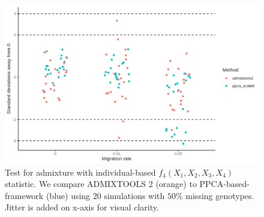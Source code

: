 \documentclass[12pt]{article}
\begin{document}
\begin{figure}[ht!]
    \includegraphics[width=16.5cm]{Images/Figures/hypothesis_test_comparison.png}
    \centering
         \caption{Test for admixture with individual-based $f_4(X_1, X_2, X_3, X_4)$ statistic. We compare ADMIXTOOLS 2 (orange) to PPCA-based-framework (blue) using 20 simulations with $50\%$ missing genotypes. Jitter is added on x-axis for visual clarity.}
    \label{fig:admixture}
\end{figure}
\end{document}
